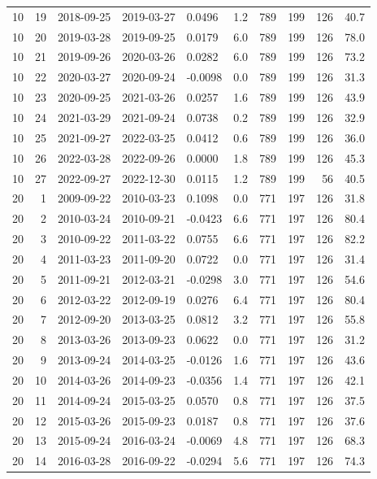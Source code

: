 \documentclass[10pt]{article}
\begin{document}
\begin{longtable}{rrrrlrrrrr}
10 & 19 & 2018-09-25 & 2019-03-27 & 0.0496 & 1.2 & 789 & 199 & 126 & 40.7 \\
10 & 20 & 2019-03-28 & 2019-09-25 & 0.0179 & 6.0 & 789 & 199 & 126 & 78.0 \\
10 & 21 & 2019-09-26 & 2020-03-26 & 0.0282 & 6.0 & 789 & 199 & 126 & 73.2 \\
10 & 22 & 2020-03-27 & 2020-09-24 & -0.0098 & 0.0 & 789 & 199 & 126 & 31.3 \\
10 & 23 & 2020-09-25 & 2021-03-26 & 0.0257 & 1.6 & 789 & 199 & 126 & 43.9 \\
10 & 24 & 2021-03-29 & 2021-09-24 & 0.0738 & 0.2 & 789 & 199 & 126 & 32.9 \\
10 & 25 & 2021-09-27 & 2022-03-25 & 0.0412 & 0.6 & 789 & 199 & 126 & 36.0 \\
10 & 26 & 2022-03-28 & 2022-09-26 & 0.0000 & 1.8 & 789 & 199 & 126 & 45.3 \\
10 & 27 & 2022-09-27 & 2022-12-30 & 0.0115 & 1.2 & 789 & 199 & 56 & 40.5 \\
20 & 1 & 2009-09-22 & 2010-03-23 & 0.1098 & 0.0 & 771 & 197 & 126 & 31.8 \\
20 & 2 & 2010-03-24 & 2010-09-21 & -0.0423 & 6.6 & 771 & 197 & 126 & 80.4 \\
20 & 3 & 2010-09-22 & 2011-03-22 & 0.0755 & 6.6 & 771 & 197 & 126 & 82.2 \\
20 & 4 & 2011-03-23 & 2011-09-20 & 0.0722 & 0.0 & 771 & 197 & 126 & 31.4 \\
20 & 5 & 2011-09-21 & 2012-03-21 & -0.0298 & 3.0 & 771 & 197 & 126 & 54.6 \\
20 & 6 & 2012-03-22 & 2012-09-19 & 0.0276 & 6.4 & 771 & 197 & 126 & 80.4 \\
20 & 7 & 2012-09-20 & 2013-03-25 & 0.0812 & 3.2 & 771 & 197 & 126 & 55.8 \\
20 & 8 & 2013-03-26 & 2013-09-23 & 0.0622 & 0.0 & 771 & 197 & 126 & 31.2 \\
20 & 9 & 2013-09-24 & 2014-03-25 & -0.0126 & 1.6 & 771 & 197 & 126 & 43.6 \\
20 & 10 & 2014-03-26 & 2014-09-23 & -0.0356 & 1.4 & 771 & 197 & 126 & 42.1 \\
20 & 11 & 2014-09-24 & 2015-03-25 & 0.0570 & 0.8 & 771 & 197 & 126 & 37.5 \\
20 & 12 & 2015-03-26 & 2015-09-23 & 0.0187 & 0.8 & 771 & 197 & 126 & 37.6 \\
20 & 13 & 2015-09-24 & 2016-03-24 & -0.0069 & 4.8 & 771 & 197 & 126 & 68.3 \\
20 & 14 & 2016-03-28 & 2016-09-22 & -0.0294 & 5.6 & 771 & 197 & 126 & 74.3 \\

\end{longtable}
\end{document}
